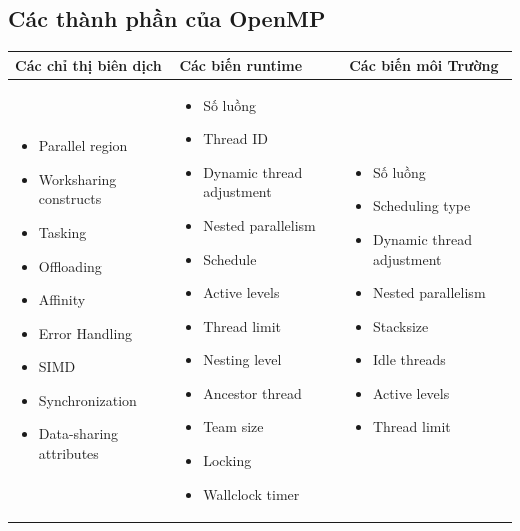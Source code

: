 \documentclass[14pt, a4paper]{article}
\numberwithin{equation}{section}
\numberwithin{figure}{section}
\numberwithin{dl}{section}
\numberwithin{md}{section}
\numberwithin{bd}{section}
\numberwithin{dn}{section}
\numberwithin{hq}{section}
\begin{document}
\subsection{Các thành phần của OpenMP}

\begin{table}[H]
    \begin{tabularx}{\textwidth}{|X|X|X|}
        \hline
        \textbf{Các chỉ thị biên dịch} & \textbf{Các biến runtime} & \textbf{Các biến môi Trường} \\
        \hline
        \begin{itemize}
            \item Parallel region
            \item Worksharing constructs
            \item Tasking
            \item Offloading
            \item Affinity
            \item Error Handling
            \item SIMD
            \item Synchronization
            \item Data-sharing attributes
        \end{itemize}
        &
        \begin{itemize}
            \item Số luồng
            \item Thread ID 
            \item Dynamic thread adjustment
            \item Nested parallelism
            \item Schedule
            \item Active levels
            \item Thread limit
            \item Nesting level
            \item Ancestor thread
            \item Team size 
            \item Locking
            \item Wallclock timer
        \end{itemize}
        &
        \begin{itemize}
            \item Số luồng
            \item Scheduling type
            \item Dynamic thread adjustment
            \item Nested parallelism
            \item Stacksize
            \item Idle threads
            \item Active levels
            \item Thread limit
        \end{itemize}
        \\
        \hline
    \end{tabularx}
\end{table}
\end{document}
